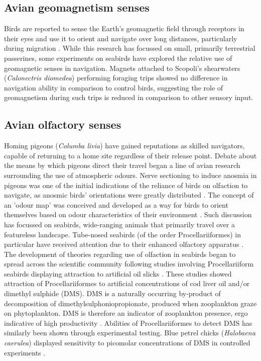 \documentclass[9pt,twocolumn,twoside,lineno]{pnas-new}
\begin{document}
\subsection{Avian geomagnetism senses}
Birds are reported to sense the Earth's geomagnetic field through receptors in their eyes and use it to orient and navigate over long distances, particularly during migration \citep{Wiltschko_2011,Hiscock_2016}. While this research has focussed on small, primarily terrestrial passerines, some experiments on seabirds have explored the relative use of geomagnetic senses in navigation. Magnets attached to Scopoli's shearwaters (\textit{Calonectris diomedea}) performing foraging trips showed no difference in navigation ability in comparison to control birds, suggesting the role of geomagnetism during such trips is reduced in comparison to other sensory input.

\subsection{Avian olfactory senses}
Homing pigeons (\textit{Columba livia}) have gained reputations as skilled navigators, capable of returning to a home site regardless of their release point. Debate about the means by which pigeons direct their travel began a line of avian research surrounding the use of atmospheric odours. Nerve sectioning to induce anosmia in pigeons was one of the initial indications of the reliance of birds on olfaction to navigate, as anosmic birds' orientations were greatly distributed \citep{Papi_1972}. The concept of an 'odour map' was conceived and developed as a way for birds to orient themselves based on odour characteristics of their environment \citep{Papi_1972,Bonadonna_2003}. Such discussion has focussed on seabirds, wide-ranging animals that primarily travel over a featureless landscape. Tube-nosed seabirds (of the order Procellariiformes) in particular have received attention due to their enhanced olfactory apparatus \citep{Bang_1960, Bang_1971, Jacobs_2012}. The development of theories regarding use of olfaction in seabirds began to spread across the scientific community following studies involving Procellariiform seabirds displaying attraction to artificial oil slicks \citep{Grubb_1972,Dell_Ariccia_2014,Nevitt_1995,Nevitt_1999,Nevitt_2000}. These studies showed attraction of Procellariiformes to artificial concentrations of cod liver oil and/or dimethyl sulphide (DMS). DMS is a naturally occurring by-product of decomposition of dimethylsulphoniopropionate, produced when zooplankton graze on phytoplankton. DMS is therefore an indicator of zooplankton presence, ergo indicative of high productivity \citep{Cantin_1996,Dacey_1986,Jean_2009,Sim__2001}. Abilities of Procellariiformes to detect DMS has similarly been shown through experimental testing. Blue petrel chicks (\textit{Halobaena caerulea}) displayed sensitivity to picomolar concentrations of DMS in controlled experiments \citep{Bonadonna_2006}.
\end{document}
